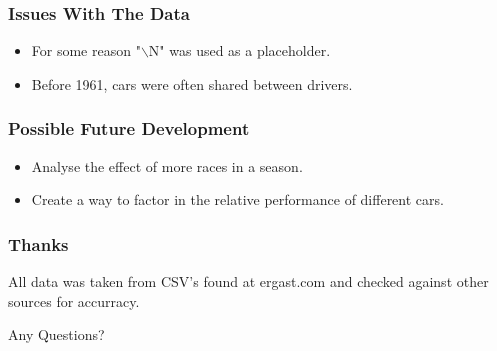 \documentclass{beamer}
\begin{document}
\begin{frame}
    \frametitle{Issues With The Data}
    \begin{itemize}
        \item For some reason "$\backslash$N" was used as a placeholder.
        \item Before 1961, cars were often shared between drivers.
    \end{itemize}
\end{frame}

\begin{frame}
    \frametitle{Possible Future Development}
    \begin{itemize}
        \item Analyse the effect of more races in a season.
        \item Create a way to factor in the relative performance of different cars.
    \end{itemize}
\end{frame}

\begin{frame}
    \frametitle{Thanks}
    \begin{center}
        All data was taken from CSV's found at ergast.com and checked against other sources for accurracy.
    
        Any Questions?
    \end{center}
\end{frame}
\end{document}
